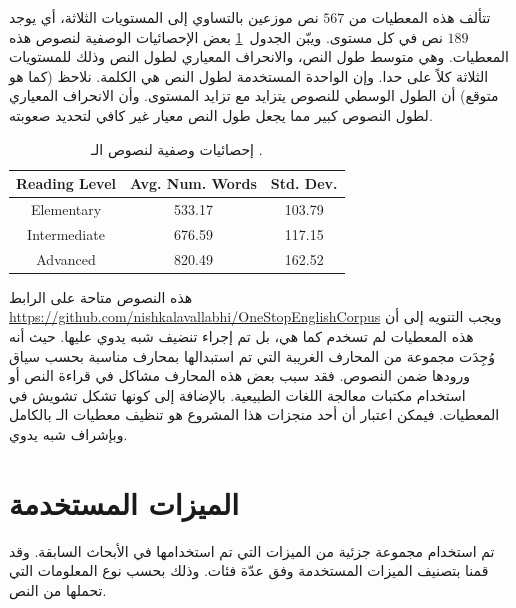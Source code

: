 تتألف هذه المعطيات من $567$ نص موزعين بالتساوي إلى المستويات الثلاثة،
أي يوجد $189$ نص في كل مستوى.
ويبّن الجدول~\ref{tbl:corpus:ose_stat} بعض الإحصائيات الوصفية لنصوص هذه المعطيات.
وهي متوسط طول النص، والانحراف المعياري لطول النص وذلك للمستويات الثلاثة كلاً على حدا.
وإن الواحدة المستخدمة لطول النص هي الكلمة.
نلاحظ (كما هو متوقع) أن الطول الوسطي للنصوص يتزايد مع تزايد المستوى.
وأن الانحراف المعياري لطول النصوص كبير مما يجعل طول النص معيار غير كافي لتحديد صعوبته.

\begin{table}[htb]
	\centering
	{
		\setlength{\tabcolsep}{0.5em} %
		\renewcommand{\arraystretch}{1.4}%
		
		\begin{tabular}{|c|c|c|}
			\hline
			
			\textbf{Reading Level} &
			\textbf{Avg. Num. Words} &
			\textbf{Std. Dev.}\\
			\hline 
			
			Elementary &
			533.17 &
			103.79 \\
			\hline
			
			Intermediate &
			676.59 &
			117.15 \\
			\hline
			
			Advanced &
			820.49 &
			162.52 \\
			\hline
			
		\end{tabular}
	}
	\caption{%
		إحصائيات وصفية لنصوص الـ .
	}
	\label{tbl:corpus:ose_stat}
\end{table}

هذه النصوص متاحة على الرابط
\url{https://github.com/nishkalavallabhi/OneStopEnglishCorpus}
ويجب التنويه إلى أن هذه المعطيات لم تسخدم كما هي، بل تم إجراء تنضيف شبه يدوي عليها.
حيث أنه وُجِدَت مجموعة من المحارف الغريبة التي تم استبدالها بمحارف مناسبة بحسب سياق ورودها ضمن النصوص.
فقد سبب بعض هذه المحارف مشاكل في قراءة النص أو استخدام مكتبات معالجة اللغات الطبيعية.
بالإضافة إلى كونها تشكل تشويش في المعطيات.
فيمكن اعتبار أن أحد منجزات هذا المشروع هو تنظيف معطيات الـ  بالكامل وبإشراف شبه يدوي.


\section{الميزات المستخدمة}
\label{sec:sys:features}
تم استخدام مجموعة جزئية من الميزات التي تم استخدامها في الأبحاث السابقة.
وقد قمنا بتصنيف الميزات المستخدمة وفق عدّة فئات.
وذلك بحسب نوع المعلومات التي تحملها من النص.

